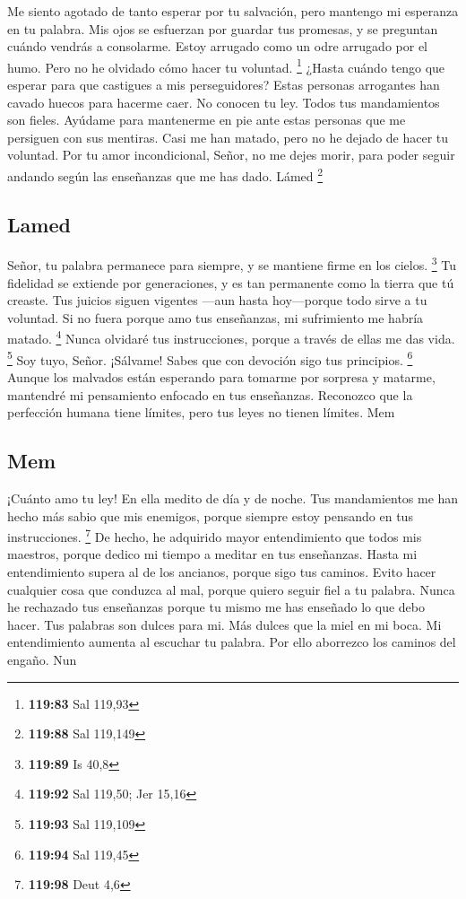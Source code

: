  Me siento agotado de tanto esperar por tu salvación, pero
mantengo mi esperanza en tu palabra.  Mis ojos se esfuerzan
por guardar tus promesas, y se preguntan cuándo vendrás a consolarme.
 Estoy arrugado como un odre arrugado por el humo. Pero no
he olvidado cómo hacer tu voluntad. \footnote{\textbf{119:83} Sal 119,93}
 ¿Hasta cuándo tengo que esperar para que castigues a mis
perseguidores?  Estas personas arrogantes han cavado huecos
para hacerme caer. No conocen tu ley.  Todos tus
mandamientos son fieles. Ayúdame para mantenerme en pie ante estas
personas que me persiguen con sus mentiras.  Casi me han
matado, pero no he dejado de hacer tu voluntad.  Por tu
amor incondicional, Señor, no me dejes morir, para poder seguir andando
según las enseñanzas que me has dado. Lámed \footnote{\textbf{119:88}
  Sal 119,149}

\hypertarget{lamed}{%
\subsection{Lamed}\label{lamed}}

 Señor, tu palabra permanece para siempre, y se mantiene
firme en los cielos. \footnote{\textbf{119:89} Is 40,8}  Tu
fidelidad se extiende por generaciones, y es tan permanente como la
tierra que tú creaste.  Tus juicios siguen vigentes ---aun
hasta hoy---porque todo sirve a tu voluntad.  Si no fuera
porque amo tus enseñanzas, mi sufrimiento me habría matado. \footnote{\textbf{119:92}
  Sal 119,50; Jer 15,16}  Nunca olvidaré tus instrucciones,
porque a través de ellas me das vida. \footnote{\textbf{119:93} Sal
  119,109}  Soy tuyo, Señor. ¡Sálvame! Sabes que con
devoción sigo tus principios. \footnote{\textbf{119:94} Sal 119,45}
 Aunque los malvados están esperando para tomarme por
sorpresa y matarme, mantendré mi pensamiento enfocado en tus enseñanzas.
 Reconozco que la perfección humana tiene límites, pero tus
leyes no tienen límites. Mem

\hypertarget{mem}{%
\subsection{Mem}\label{mem}}

 ¡Cuánto amo tu ley! En ella medito de día y de noche.
 Tus mandamientos me han hecho más sabio que mis enemigos,
porque siempre estoy pensando en tus instrucciones. \footnote{\textbf{119:98}
  Deut 4,6}  De hecho, he adquirido mayor entendimiento que
todos mis maestros, porque dedico mi tiempo a meditar en tus enseñanzas.
 Hasta mi entendimiento supera al de los ancianos, porque
sigo tus caminos.  Evito hacer cualquier cosa que conduzca
al mal, porque quiero seguir fiel a tu palabra.  Nunca he
rechazado tus enseñanzas porque tu mismo me has enseñado lo que debo
hacer.  Tus palabras son dulces para mi. Más dulces que la
miel en mi boca.  Mi entendimiento aumenta al escuchar tu
palabra. Por ello aborrezco los caminos del engaño. Nun

